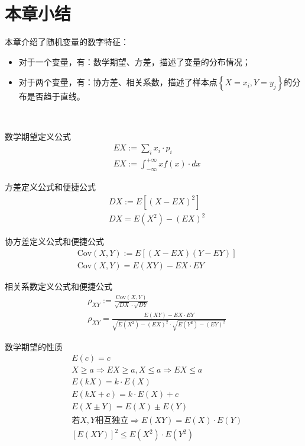 \section{本章小结}

本章介绍了随机变量的数字特征：
\begin{itemize}
    \item 对于一个变量，有：数学期望、方差，描述了变量的分布情况；
    \item 对于两个变量，有：协方差、相关系数，描述了样本点$\left\{ X=x_i,Y=y_j \right\} $的分布是否趋于直线。
\end{itemize}

~

数学期望定义公式
\begin{align*}
&EX:=\sum_i{x_i\cdot p_i} \\
&EX:=\int_{-\infty}^{+\infty}{xf\left( x \right) \cdot dx}
\end{align*}

方差定义公式和便捷公式
\begin{align*}
&DX:=E\left[ \left( X-EX \right) ^2 \right] \\
&DX=E\left( X^2 \right) -\left( EX \right) ^2
\end{align*}

协方差定义公式和便捷公式
\begin{align*}
&\mathrm{Cov}\left( X,Y \right) :=E\left[ \left( X-EX \right) \left( Y-EY \right) \right] \\
&\mathrm{Cov}\left( X,Y \right) =E\left( XY \right) -EX\cdot EY
\end{align*}

相关系数定义公式和便捷公式
\begin{align*}
&\rho _{XY}:=\frac{\mathrm{Cov}\left( X,Y \right)}{\sqrt{DX}\cdot \sqrt{DY}} \\
&\rho _{XY}=\frac{E\left( XY \right) -EX\cdot EY}{\sqrt{E\left( X^2 \right) -\left( EX \right) ^2}\cdot \sqrt{E\left( Y^2 \right) -\left( EY \right) ^2}}
\end{align*}

数学期望的性质
\begin{align*}
&E\left( c \right) =c \\
&X\geqslant a\Rightarrow EX\geqslant a,X\leqslant a\Rightarrow EX\leqslant a \\
&E\left( kX \right) =k\cdot E\left( X \right) \\
&E\left( kX+c \right) =k\cdot E\left( X \right) +c \\
&E\left( X\pm Y \right) =E\left( X \right) \pm E\left( Y \right) \\
&\text{若}X,Y\text{相互独立}\Rightarrow E\left( XY \right) =E\left( X \right) \cdot E\left( Y \right) \\
&\left[ E\left( XY \right) \right] ^2\leqslant E\left( X^2 \right) \cdot E\left( Y^2 \right)
\end{align*}

